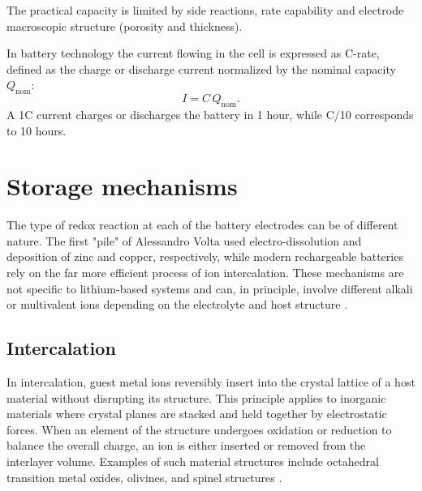 The practical capacity is limited by side reactions, rate capability and electrode macroscopic structure (porosity and thickness).


In battery technology the current flowing in the cell is expressed as C-rate, defined as the charge or discharge current normalized by the nominal capacity $Q_{\mathrm{nom}}$:
\begin{equation}
    I = C\, Q_{\mathrm{nom}}.
\end{equation}
A 1C current charges or discharges the battery in 1 hour, while C/10 corresponds to 10 hours.

\section{Storage mechanisms}

The type of redox reaction at each of the battery electrodes can be of different nature.
The first "pile" of Alessandro Volta used electro-dissolution and deposition of zinc and copper, respectively, while modern rechargeable batteries rely on the far more efficient process of ion intercalation.
These mechanisms are not specific to lithium-based systems and can, in principle, involve different alkali or multivalent ions depending on the electrolyte and host structure \cite{PAN2025184607}.

\subsection{Intercalation}

In intercalation, guest metal ions reversibly insert into the crystal lattice of a host material without disrupting its structure. 
This principle applies to inorganic materials where crystal planes are stacked and held together by electrostatic forces.
When an element of the structure undergoes oxidation or reduction to balance the overall charge, an ion is either inserted or removed from the interlayer volume.
Examples of such material structures include octahedral transition metal oxides, olivines, and spinel structures \cite{KOECH2024321}.

